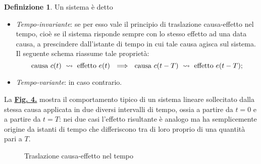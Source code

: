 \documentclass[a4paper]{article}
\theoremstyle{definition}
\newtheorem{defn}{Definizione}[section]
\begin{document}
		\begin{defn}
			Un sistema è detto
			\begin{itemize}
				\item \textit{Tempo-invariante}: se per esso vale il principio di traslazione causa-effetto nel tempo, cioè se il sistema risponde sempre con lo stesso effetto ad una data causa, a prescindere dall’istante di tempo in cui tale causa agisca
				sul sistema.\\
				Il seguente schema riassume tale proprietà:
				\[
					\textup{causa}\ c(t)\ \rightsquigarrow \ \textup{effetto}\ e(t)\ \
					\Longrightarrow\ \ \textup{causa}\ c(t - T)\  \rightsquigarrow \ \textup{effetto}\ e(t-T);
				\]
				\item \textit{Tempo-variante}: in caso contrario.
			\end{itemize}
			
			La \hyperref[fig:time]{\textbf{Fig. 4.}} mostra il comportamento tipico di un sistema lineare sollecitato
			dalla stessa causa applicata in due diversi intervalli di tempo, ossia a partire da $ t = 0 $
			e a partire da $ t = T $: nei due casi l’effetto risultante è analogo ma ha semplicemente
			origine da istanti di tempo che differiscono tra di loro proprio di una quantità pari a $ T $.
			
			\begin{figure}[h!]
				\centering
				\caption{Traslazione causa-effetto nel tempo}
				\label{fig:time}
			\end{figure}
		\end{defn}
		
\end{document}
